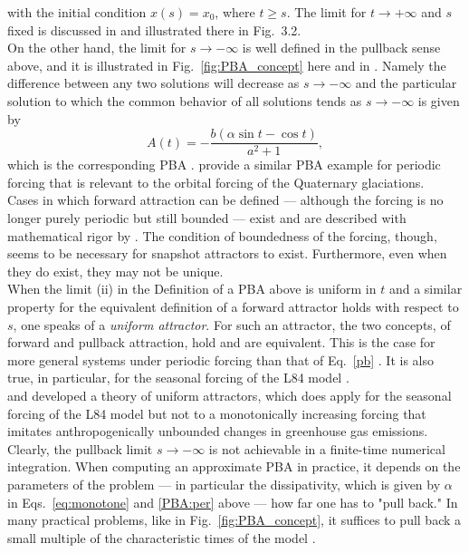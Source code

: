 \documentclass[%
 aip, cha,
 amsmath,amssymb,
 reprint,%
author-year,%
]{revtex4-1}
\newcommand{\0}{\mathbf 0}
\begin{document}
with the initial condition \( x(s) = x_0 \), where \( t \geq s \). The limit for $t \to + \infty$ and $s$ fixed is discussed in \citet[Sec.~3.2.1]{Car.Han.2016} and illustrated there in Fig.~3.2. \\
On the other hand, the limit for $s \to - \infty$ is well defined in the pullback sense above, and it is illustrated in Fig.~\ref{fig:PBA_concept} here and in  \citet[Fig.~3.1]{Car.Han.2016}.  
Namely the difference between any two solutions will decrease as $s \to - \infty$ and the particular solution to which the common behavior of all solutions tends as $s \to - \infty$ is given by 
\begin{equation}
	{A(t)} = - \frac{b(\alpha \sin t - \cos t)}{a^2 + 1} , \tag{A5}
	\label{PBA:per}
\end{equation}
which is the corresponding PBA \citep{Car.Han.2016}. \cite{keno} provide a similar PBA example for periodic forcing that is relevant to the orbital forcing of the Quaternary glaciations. \\
Cases in which forward attraction can be defined — although the forcing is no longer purely periodic but still bounded — exist and are described with mathematical rigor by \citet[Ch.~10--12]{Kloeden.Yang.2020}. The condition of boundedness of the forcing, though, seems to be necessary for snapshot attractors to exist. Furthermore, even when they do exist, they may not be unique. \\
When the limit (ii) in the Definition of a PBA above is uniform in $t$ and a similar property for the equivalent definition of a forward attractor holds with respect to $s$, one speaks of a {\em uniform attractor}. For such an attractor, the two concepts, of forward and pullback attraction, hold and are equivalent. This is the case for more general systems under periodic forcing than that of Eq.~\eqref{pb} \citep{Car.Han.2016, Kloeden.Yang.2020}. It is also true, in particular, for the seasonal forcing of the L84 model \citep{Anguiano.Car.2014}.\\ 
\cite{Haraux.1991} and \cite{Vishik.1992} developed a theory of uniform attractors, which does apply for the seasonal forcing of the L84 model \citep{Anguiano.Car.2014, drotos} but not to a monotonically increasing forcing that imitates anthropogenically unbounded changes in greenhouse gas emissions.\\ 
Clearly, the pullback limit $s \to - \infty$ is not achievable in a finite-time numerical integration. When computing an approximate PBA in practice, it depends on the parameters of the problem --- in particular the dissipativity, which is given by $\alpha$ in Eqs.~\eqref{eq:monotone} and \eqref{PBA:per} above --- how far one has to "pull back." In many practical problems, like in Fig.~\ref{fig:PBA_concept}, it suffices to pull back a small multiple of the characteristic times of the model \citep{chekroun, Pierini.Ghil, charo}. 
\end{document}
